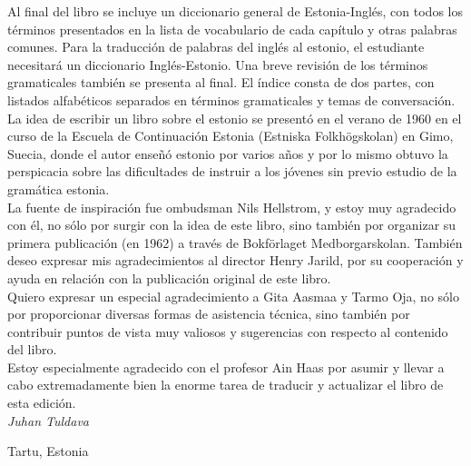 Al final del libro se incluye un diccionario general de Estonia-Inglés, con todos los términos presentados en la lista de vocabulario de cada capítulo y otras palabras comunes. Para la traducción de palabras del inglés al estonio, el estudiante necesitará un diccionario Inglés-Estonio. Una breve revisión de los términos gramaticales también se presenta al final. El índice consta de dos partes, con listados alfabéticos separados en términos gramaticales y temas de conversación.\\

La idea de escribir un libro sobre el estonio se presentó en el verano de 1960 en el curso de la Escuela de Continuación Estonia (Estniska Folkhögskolan) en Gimo, Suecia, donde el autor enseñó estonio por varios años y por lo mismo obtuvo la perspicacia sobre las dificultades de instruir a los jóvenes sin previo estudio de la gramática estonia.\\

La fuente de inspiración fue ombudsman Nils Hellstrom, y estoy muy agradecido con él, no sólo por surgir con la idea de este libro, sino también por organizar su primera publicación (en 1962) a través de Bokförlaget Medborgarskolan. También deseo expresar mis agradecimientos al director Henry Jarild, por su cooperación y ayuda en relación con la publicación original de este libro.\\

Quiero expresar un especial agradecimiento a Gita Aasmaa y Tarmo Oja, no sólo por proporcionar diversas formas de asistencia técnica, sino también por contribuir puntos de vista muy valiosos y sugerencias con respecto al contenido del libro.\\

Estoy especialmente agradecido con el profesor Ain Haas por asumir y llevar a cabo extremadamente bien la enorme tarea de traducir y actualizar el libro de esta edición.\\

\hfill \textit{Juhan Tuldava}

\hfill Tartu, Estonia
